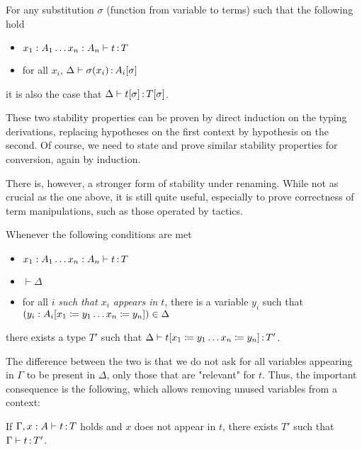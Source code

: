 \begin{property}
  \label{prop:stab-subst}
  For any substitution $\sigma$ (function from variable to terms)
  such that the following hold
  \begin{itemize}
    \item $x_1 : A_1 \dots x_n : A_n \vdash t \operatorname{:} T$
    \item for all $x_i$, $\Delta \vdash \sigma(x_i) \operatorname{:} A_i[\sigma]$
  \end{itemize} 
  it is also the case that $\Delta \vdash t[\sigma] \operatorname{:} T[\sigma]$.
\end{property}

These two stability properties can be proven by direct induction on the typing derivations,
replacing hypotheses on the first context by hypothesis on the second. Of course, we need to
state and prove similar stability properties for conversion, again by induction.

There is, however, a stronger form of stability under renaming. While not as crucial as the
one above, it is still quite useful, especially to prove correctness of term manipulations,
such as those operated by tactics.

\begin{property}
  \label{prop:strong-stab-renaming}
  Whenever the following conditions are met
  \begin{itemize}
    \item $x_1 : A_1 \dots x_n : A_n \vdash t \operatorname{:} T$
    \item $\vdash \Delta$
    \item for all $i$ \emph{such that $x_i$ appears in $t$}, there is a variable $y_i$ such that $(y_i : A_i[x_1 \coloneqq y_1 \dots x_n \coloneqq y_n]) \in \Delta$
  \end{itemize} 
  there exists a type $T'$ such that $\Delta \vdash t[x_1 \coloneqq y_1 \dots x_n \coloneqq y_n] \operatorname{:} T'$.
\end{property}

The difference between the two is that we do not ask for all variables appearing in $\Gamma$
to be present in $\Delta$, only those that are "relevant" for $t$.
Thus, the important consequence is the following, which allows removing unused variables
from a context:

\begin{property}
  \label{prop:strengthening}
  If $\Gamma, x : A \vdash t \operatorname{:} T$ holds and $x$ does not appear in $t$,
  there exists $T'$ such that $\Gamma \vdash t \operatorname{:} T'$.
\end{property}

